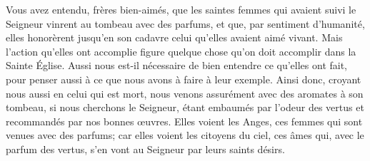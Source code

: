 Vous avez entendu, frères bien-aimés,
	que les saintes femmes qui avaient suivi le Seigneur
	vinrent au tombeau avec des parfums,
	et que, par sentiment d’humanité,
	elles honorèrent jusqu’en son cadavre
		celui qu’elles avaient aimé vivant.
Mais l’action qu’elles ont accomplie
	figure quelque chose qu’on doit accomplir dans la Sainte Église.
Aussi nous est-il nécessaire de bien entendre ce qu’elles ont fait,
	pour penser aussi à ce que nous avons à faire à leur exemple.
Ainsi donc, croyant nous aussi en celui qui est mort,
	nous venons assurément avec des aromates à son tombeau,
		si nous cherchons le Seigneur,
	étant embaumés par l’odeur des vertus et recommandés par nos bonnes œuvres.
Elles voient les Anges, ces femmes qui sont venues avec des parfums;
	car elles voient les citoyens du ciel,
	ces âmes qui, avec le parfum des vertus,
		s’en vont au Seigneur par leurs saints désirs.
